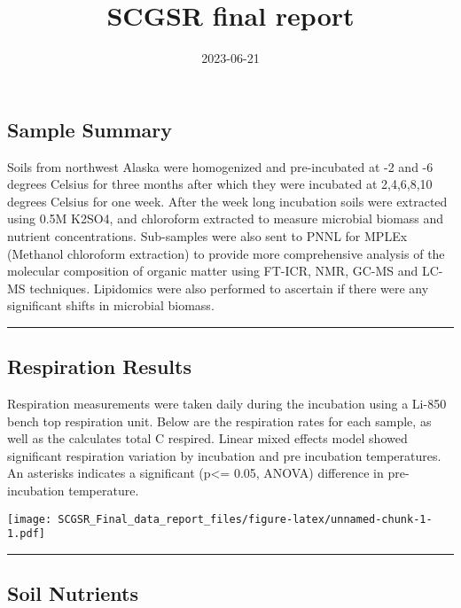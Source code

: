 \documentclass[
]{article}
\title{SCGSR final report}
\author{}
\date{\vspace{-2.5em}2023-06-21}
\begin{document}
\maketitle

\hypertarget{sample-summary}{%
\subsection{Sample Summary}\label{sample-summary}}

Soils from northwest Alaska were homogenized and pre-incubated at -2 and
-6 degrees Celsius for three months after which they were incubated at
2,4,6,8,10 degrees Celsius for one week. After the week long incubation
soils were extracted using 0.5M K2SO4, and chloroform extracted to
measure microbial biomass and nutrient concentrations. Sub-samples were
also sent to PNNL for MPLEx (Methanol chloroform extraction) to provide
more comprehensive analysis of the molecular composition of organic
matter using FT-ICR, NMR, GC-MS and LC-MS techniques. Lipidomics were
also performed to ascertain if there were any significant shifts in
microbial biomass.

\begin{center}\rule{0.5\linewidth}{0.5pt}\end{center}

\hypertarget{respiration-results}{%
\subsection{Respiration Results}\label{respiration-results}}

Respiration measurements were taken daily during the incubation using a
Li-850 bench top respiration unit. Below are the respiration rates for
each sample, as well as the calculates total C respired. Linear mixed
effects model showed significant respiration variation by incubation and
pre incubation temperatures. An asterisks indicates a significant
(p\textless= 0.05, ANOVA) difference in pre-incubation temperature.

\texttt{[image: SCGSR\_Final\_data\_report\_files/figure-latex/unnamed-chunk-1-1.pdf]}

\begin{center}\rule{0.5\linewidth}{0.5pt}\end{center}

\hypertarget{soil-nutrients}{%
\subsection{Soil Nutrients}\label{soil-nutrients}}
\end{document}
